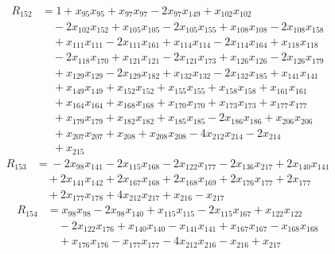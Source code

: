\begin{align*}
R_{152}&={}1 +x_{95}x_{95} +x_{97}x_{97} -2x_{97}x_{149} +x_{102}x_{102}\\
&\quad{}-2x_{102}x_{152} +x_{105}x_{105} -2x_{105}x_{155} +x_{108}x_{108} -2x_{108}x_{158}\\
&\quad{}+x_{111}x_{111} -2x_{111}x_{161} +x_{114}x_{114} -2x_{114}x_{164} +x_{118}x_{118}\\
&\quad{}-2x_{118}x_{170} +x_{121}x_{121} -2x_{121}x_{173} +x_{126}x_{126} -2x_{126}x_{179}\\
&\quad{}+x_{129}x_{129} -2x_{129}x_{182} +x_{132}x_{132} -2x_{132}x_{185} +x_{141}x_{141}\\
&\quad{}+x_{149}x_{149} +x_{152}x_{152} +x_{155}x_{155} +x_{158}x_{158} +x_{161}x_{161}\\
&\quad{}+x_{164}x_{164} +x_{168}x_{168} +x_{170}x_{170} +x_{173}x_{173} +x_{177}x_{177}\\
&\quad{}+x_{179}x_{179} +x_{182}x_{182} +x_{185}x_{185} -2x_{186}x_{186} +x_{206}x_{206}\\
&\quad{}+x_{207}x_{207} +x_{208} +x_{208}x_{208} -4x_{212}x_{214} -2x_{214}\\
&\quad{}+x_{215}
\end{align*}
\begin{align*}
R_{153}&={}-2x_{98}x_{141} -2x_{115}x_{168} -2x_{122}x_{177} -2x_{136}x_{217} +2x_{140}x_{141}\\
&\quad{}+2x_{141}x_{142} +2x_{167}x_{168} +2x_{168}x_{169} +2x_{176}x_{177} +2x_{177}\\
&\quad{}+2x_{177}x_{178} +4x_{212}x_{217} +x_{216} -x_{217}
\end{align*}
\begin{align*}
R_{154}&={}x_{98}x_{98} -2x_{98}x_{140} +x_{115}x_{115} -2x_{115}x_{167} +x_{122}x_{122}\\
&\quad{}-2x_{122}x_{176} +x_{140}x_{140} -x_{141}x_{141} +x_{167}x_{167} -x_{168}x_{168}\\
&\quad{}+x_{176}x_{176} -x_{177}x_{177} -4x_{212}x_{216} -x_{216} +x_{217}
\end{align*}
\endgroup
